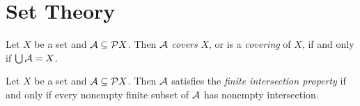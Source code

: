 \section{Set Theory}

\begin{definition}[Cover]
    Let $X$ be a set and $\AA \subseteq \pow X$. Then $\AA$ \emph{covers} $X$,
    or is a \emph{covering} of $X$, if and only if $\bigcup \AA = X$.
\end{definition}

\begin{definition}
    Let $X$ be a set and $\AA \subseteq \pow X$. Then $\AA$ satisfies the \emph{finite intersection property} if and only if every nonempty finite subset of $\AA$
    has nonempty intersection.
\end{definition}